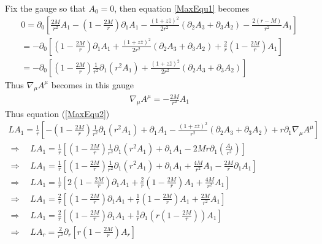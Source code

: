\documentclass[12pt]{article}
\def\nn{\nonumber}
\begin{document}
Fix the gauge so that $A_{0} =0$, then equation \ref{MaxEqu1} becomes
\begin{gather}
0
=
\partial_{0}
\left[
\frac{2 M}{r^{2}}
A_{1}
-
(1 - \frac{2 M}{r})
\partial_{1}
A_{1}
-
\frac{(1 + z \bar{z})^{2}}{2 r^{2}}
(\partial_{2} A_{3} + \partial_{3} A_{2})
-
\frac{2 (r - M)}{r^{2}}
A_{1}
\right]
\nn \\
=
-
\partial_{0}
\left[
(1 - \frac{2 M}{r})
\partial_{1}
A_{1}
+
\frac{(1 + z \bar{z})^{2}}{2 r^{2}}
(\partial_{2} A_{3} + \partial_{3} A_{2})
+
\frac{2}{r}
 (1 - \frac{2 M}{r})
A_{1}
\right]
\nn \\
=
-
\partial_{0}
\left[
(1 - \frac{2 M}{r})
\frac{1}{r^{2}}
\partial_{1}
(r^{2}
A_{1})
+
\frac{(1 + z \bar{z})^{2}}{2 r^{2}}
(\partial_{2} A_{3} + \partial_{3} A_{2})
\right]
\end{gather}
Thus $\nabla_{\mu} A^{\mu}$ becomes in this gauge
\begin{gather}
\nabla_{\mu}A^{\mu}
=
-
\frac{2 M}{r^{2}}
A_{1}
\end{gather}
Thus equation (\ref{MaxEqu2})
\begin{gather}
L A_{1}
=
\frac{1}{r}
\left[
-
(1-
\frac{2 M}{r})
\frac{1}{r^{2}}
\partial_{1}(r^{2} A_{1})
+
\partial_{1}
A_{1}
-
\frac{(1 + z \bar{z})^{2}}{r^{2}}
(
\partial_{2}
A_{3}
+
\partial_{3}
A_{2})
+
r
\partial_{1}
\nabla_{\mu}
A^{\mu}
\right]
\nn \\
\Rightarrow
\quad
L A_{1}
=
\frac{1}{r}
\left[
(1-
\frac{2 M}{r})
\frac{1}{r^{2}}
\partial_{1}(r^{2} A_{1})
+
\partial_{1}
A_{1}
-
2 M r
\partial_{1}
\left(
\frac{A_{1}}{r^{2}}
\right)
\right]
\nn \\
\Rightarrow
\quad
L A_{1}
=
\frac{1}{r}
\left[
(1-
\frac{2 M}{r})
\frac{1}{r^{2}}
\partial_{1}(r^{2} A_{1})
+
\partial_{1}
A_{1}
+
\frac{4 M}{r^{2}}
A_{1}
-
\frac{2 M}{r}
\partial_{1}
A_{1}
\right]
\nn \\
\Rightarrow
\quad
L A_{1}
=
\frac{1}{r}
\left[
2
(1 - \frac{2 M}{r})
\partial_{1}
A_{1}
+
\frac{2}{r}
(1-
\frac{2 M}{r})
A_{1}
+
\frac{4 M}{r^{2}}
A_{1}
\right]
\nn \\
\Rightarrow
\quad
L A_{1}
=
\frac{2}{r}
\left[
(1 - \frac{2 M}{r})
\partial_{1}
A_{1}
+
\frac{1}{r}
(1-
\frac{2 M}{r})
A_{1}
+
\frac{2 M}{r^{2}}
A_{1}
\right]
\nn \\
\Rightarrow
\quad
L A_{1}
=
\frac{2}{r}
\left[
(1 - \frac{2 M}{r})
\partial_{1}
A_{1}
+
\frac{1}{r}
\partial_{1}
\left(
r
(1-
\frac{2 M}{r})
\right)
A_{1}
\right]
\nn \\
\Rightarrow
\quad
L A_{r}
=
\frac{2}{r^{2}}
\partial_{r}
\left[
r
(1-
\frac{2 M}{r})
A_{r}
\right]
\end{gather}
\end{document}
